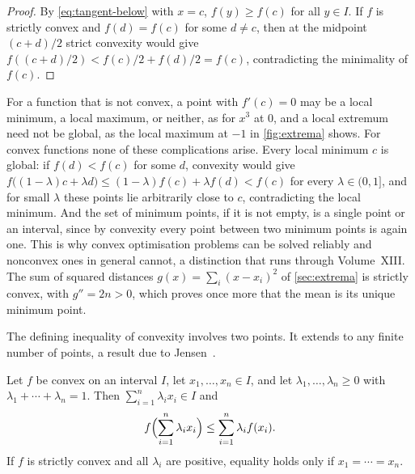 \begin{proof}
By \eqref{eq:tangent-below} with $x=c$, $f(y)\ge f(c)$ for all $y\in I$. If $f$ is strictly convex and $f(d)=f(c)$ for some $d\ne c$, then at the midpoint $(c+d)/2$ strict convexity would give $f((c+d)/2)<f(c)/2+f(d)/2=f(c)$, contradicting the minimality of $f(c)$.
\end{proof}

For a function that is not convex, a point with $f'(c)=0$ may be a local minimum, a local maximum, or neither, as for $x^3$ at $0$, and a local extremum need not be global, as the local maximum at $-1$ in \cref{fig:extrema} shows. For convex functions none of these complications arise. Every local minimum $c$ is global: if $f(d)<f(c)$ for some $d$, convexity would give $f\bigl((1-\lambda)c+\lambda d\bigr)\le(1-\lambda)f(c)+\lambda f(d)<f(c)$ for every $\lambda\in(0,1]$, and for small $\lambda$ these points lie arbitrarily close to $c$, contradicting the local minimum. And the set of minimum points, if it is not empty, is a single point or an interval, since by convexity every point between two minimum points is again one. This is why convex optimisation problems can be solved reliably and nonconvex ones in general cannot, a distinction that runs through Volume~XIII. The sum of squared distances $g(x)=\sum_i(x-x_i)^2$ of \cref{sec:extrema} is strictly convex, with $g''=2n>0$, which proves once more that the mean is its unique minimum point.

The defining inequality of convexity involves two points. It extends to any finite number of points, a result due to Jensen~\cite{jensen1906}.

\begin{theorem}
\label{thm:jensen}
Let $f$ be convex on an interval $I$, let $x_1,\ldots,x_n\in I$, and let $\lambda_1,\ldots,\lambda_n\ge0$ with $\lambda_1+\cdots+\lambda_n=1$. Then $\sum_{i=1}^n\lambda_ix_i\in I$ and
\[
f\Bigl(\sum_{i=1}^n\lambda_ix_i\Bigr)\le\sum_{i=1}^n\lambda_if(x_i) .
\]
If $f$ is strictly convex and all $\lambda_i$ are positive, equality holds only if $x_1=\cdots=x_n$.
\end{theorem}

